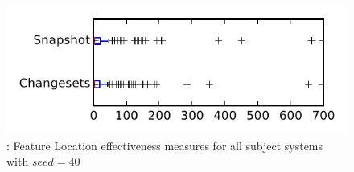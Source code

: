 
\begin{figure}
\centering
\includegraphics[height=0.4\textheight]{figures/flt_seed/rq1_tiny_40}
\caption{\rone: Feature Location effectiveness measures for all subject systems with $seed=40$}
\label{fig:flt_seed:rq1:tiny}
\end{figure}
